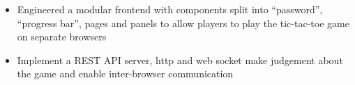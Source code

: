 
\begin{itemize}
  \item Engineered a modular frontend with components split into “password”,
  “progress bar”, pages and panels to allow players to play the
  tic-tac-toe game on separate browsers
  \item Implement a REST API server, http and web socket make judgement
  about the game and enable inter-browser communication
\end{itemize}

